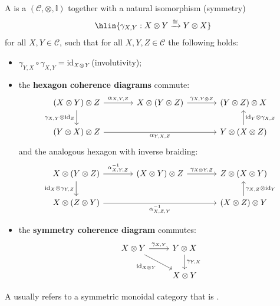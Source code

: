 \begin{definition} \label{definition:symmetric_monoidal_category}
A  is a  $(\mathcal{C}, \otimes, \mathbb{I})$ together with a natural isomorphism (symmetry)
$$\hlin{\gamma_{X,Y}: X \otimes Y \xrightarrow{\cong} Y \otimes X}$$
for all $X, Y \in \mathcal{C}$, such that for all $X, Y, Z \in \mathcal{C}$ the following holds:
\begin{itemize}
    \item $\gamma_{Y,X} \circ \gamma_{X,Y} = \mathrm{id}_{X \otimes Y}$ (involutivity);
        \item the \textbf{hexagon coherence diagrams} commute:
        \[
        \begin{tikzcd}[column sep=large]
        (X \otimes Y) \otimes Z \arrow[r, "\alpha_{X,Y,Z}"] \arrow[d, "\gamma_{X,Y} \otimes \mathrm{id}_Z"'] & X \otimes (Y \otimes Z) \arrow[r, "\gamma_{X, Y \otimes Z}"] & (Y \otimes Z) \otimes X \\
        (Y \otimes X) \otimes Z \arrow[rr, "\alpha_{Y,X,Z}"'] & & Y \otimes (X \otimes Z) \arrow[u, "\mathrm{id}_Y \otimes \gamma_{X,Z}"']
        \end{tikzcd}
        \]
        and the analogous hexagon with inverse braiding:
        \[
        \begin{tikzcd}[column sep=large]
        X \otimes (Y \otimes Z) \arrow[r, "\alpha^{-1}_{X,Y,Z}"] \arrow[d, "\mathrm{id}_X \otimes \gamma_{Y,Z}"'] & (X \otimes Y) \otimes Z \arrow[r, "\gamma_{X \otimes Y, Z}"] & Z \otimes (X \otimes Y) \\
        X \otimes (Z \otimes Y) \arrow[rr, "\alpha^{-1}_{X,Z,Y}"'] & & (X \otimes Z) \otimes Y \arrow[u, "\gamma_{X,Z} \otimes \mathrm{id}_Y"']
        \end{tikzcd}
        \]
    \item the \textbf{symmetry coherence diagram} commutes:
        \[
        \begin{tikzcd}
        X \otimes Y \arrow[r, "\gamma_{X,Y}"] \arrow[dr, swap, "\mathrm{id}_{X \otimes Y}"] & Y \otimes X \arrow[d, "\gamma_{Y,X}"] \\
        & X \otimes Y
        \end{tikzcd}
        \]
\end{itemize}
A  usually refers to a symmetric monoidal category that is . 
\end{definition}